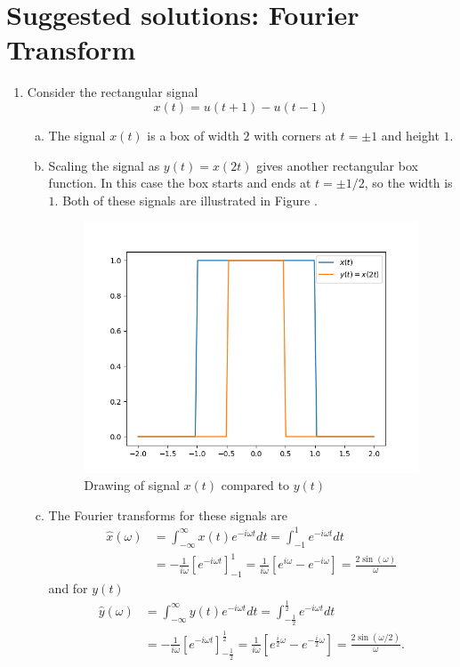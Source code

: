 \newpage
\section{Suggested solutions: Fourier Transform}
\begin{enumerate}
\item Consider the rectangular signal 
$$x(t)=u(t+1)-u(t-1)$$

\begin{enumerate}[a)]
\item The signal $x(t)$ is a box of width $2$ with corners at $t=\pm 1$ and height $1$. 

\item Scaling the signal as $y(t)=x(2t)$ gives another rectangular box function. In this case the box starts and ends at $t=\pm 1/2$, so the width is $1$. Both of these signals are illustrated in Figure .

\begin{figure}
    \centering
    \includegraphics{ch08/figures/fig:ex8.1a.png}
    \caption{Drawing of signal $x(t)$ compared to $y(t)$}
    \label{fig:ex8.1a}
\end{figure}

\item The Fourier transforms for these signals are
\begin{align*}
    \hat{x}(\omega)&=\int_{-\infty}^{\infty}x(t)e^{-i\omega t}dt=\int_{-1}^{1}e^{-i\omega t}dt  \\
    &=-\frac{1}{i\omega}[e^{-i\omega t}]_{-1}^{1}=\frac{1}{i\omega}\left[e^{i\omega}-e^{-i\omega}\right]=\frac{2\sin(\omega)}{\omega}
\end{align*}
and for $y(t)$
\begin{align*}
    \hat{y}(\omega)&=\int_{-\infty}^{\infty}y(t)e^{-i\omega t}dt=\int_{-\frac{1}{2}}^{\frac{1}{2}}e^{-i\omega t}dt  \\
    &=-\frac{1}{i\omega}[e^{-i\omega t}]_{-\frac{1}{2}}^{\frac{1}{2}}=\frac{1}{i\omega}\left[e^{\frac{i}{2}\omega}-e^{-\frac{i}{2}\omega}\right]=\frac{2\sin(\omega/2)}{\omega}.
\end{align*}


\end{enumerate}
\end{enumerate}
